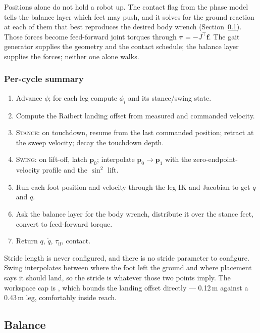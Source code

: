 \documentclass[11pt,a4paper]{article}
\begin{document}
Positions alone do not hold a robot up. The contact flag from the phase model
tells the balance layer which feet may push, and it solves for the ground
reaction at each of them that best reproduces the desired body wrench
(Section~\ref{sec:balance}). Those forces become feed-forward joint torques
through $\boldsymbol{\tau} = -J^{\top}\mathbf{f}$. The gait generator supplies
the geometry and the contact schedule; the balance layer supplies the forces;
neither one alone walks.

\subsubsection{Per-cycle summary}

\begin{enumerate}\itemsep2pt
  \item Advance $\phi$; for each leg compute $\phi_i$ and its stance/swing state.
  \item Compute the Raibert landing offset from measured and commanded velocity.
  \item \textsc{Stance}: on touchdown, resume from the last commanded position;
        retract at the sweep velocity; decay the touchdown depth.
  \item \textsc{Swing}: on lift-off, latch $\mathbf{p}_0$; interpolate
        $\mathbf{p}_0 \to \mathbf{p}_1$ with the zero-endpoint-velocity profile
        and the $\sin^2$ lift.
  \item Run each foot position and velocity through the leg IK and Jacobian to
        get $q$ and $\dot q$.
  \item Ask the balance layer for the body wrench, distribute it over the
        stance feet, convert to feed-forward torque.
  \item Return $q$, $\dot q$, $\tau_{\text{ff}}$, contact.
\end{enumerate}

Stride length is never configured, and there is no stride parameter to
configure. Swing interpolates between where the foot left the ground and where
placement says it should land, so the stride is whatever those two points
imply. The workspace cap is , which bounds the landing
offset directly --- 0.12\,m against a 0.43\,m leg, comfortably inside reach.

\subsection{Balance}
\label{sec:balance}
\end{document}
